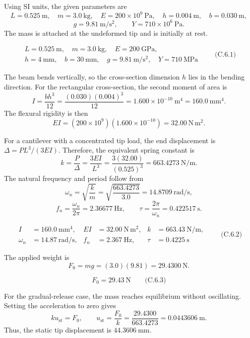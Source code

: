 Using SI units, the given parameters are
\[
L=0.525\ \mathrm{m},\quad m=3.0\ \mathrm{kg},\quad
E=200\times10^{9}\ \mathrm{Pa},\quad
h=0.004\ \mathrm{m},\quad b=0.030\ \mathrm{m},
\]
\[
g=9.81\ \mathrm{m/s^2},\qquad Y=710\times10^{6}\ \mathrm{Pa}.
\]
The mass is attached at the undeformed tip and is initially at rest.

\[
\boxed{\begin{gathered}
L=0.525\ \mathrm{m},\quad m=3.0\ \mathrm{kg},\quad E=200\ \mathrm{GPa},\\
h=4\ \mathrm{mm},\quad b=30\ \mathrm{mm},\quad
g=9.81\ \mathrm{m/s^2},\quad Y=710\ \mathrm{MPa}
\end{gathered}}
\qquad\text{(C.6.1)}
\]

The beam bends vertically, so the cross-section dimension \(h\) lies in the bending direction. For the rectangular cross-section, the second moment of area is
\[
I=\frac{bh^3}{12}
 =\frac{(0.030)(0.004)^3}{12}
 =1.600\times10^{-10}\ \mathrm{m^4}
 =160.0\ \mathrm{mm^4}.
\]
The flexural rigidity is then
\[
EI=(200\times10^9)(1.600\times10^{-10})
 =32.00\ \mathrm{N\,m^2}.
\]

For a cantilever with a concentrated tip load, the end displacement is \(\Delta=PL^3/(3EI)\). Therefore, the equivalent spring constant is
\[
k=\frac{P}{\Delta}=\frac{3EI}{L^3}
 =\frac{3(32.00)}{(0.525)^3}
 =663.4273\ \mathrm{N/m}.
\]
The natural frequency and period follow from
\[
\omega_n=\sqrt{\frac{k}{m}}
 =\sqrt{\frac{663.4273}{3.0}}
 =14.8709\ \mathrm{rad/s},
\]
\[
f_n=\frac{\omega_n}{2\pi}=2.36677\ \mathrm{Hz},
\qquad
\tau=\frac{2\pi}{\omega_n}=0.422517\ \mathrm{s}.
\]

\[
\boxed{\begin{aligned}
I&=160.0\ \mathrm{mm^4},&
EI&=32.00\ \mathrm{N\,m^2},&
k&=663.43\ \mathrm{N/m},\\
\omega_n&=14.87\ \mathrm{rad/s},&
f_n&=2.367\ \mathrm{Hz},&
\tau&=0.4225\ \mathrm{s}
\end{aligned}}
\qquad\text{(C.6.2)}
\]

The applied weight is
\[
F_0=mg=(3.0)(9.81)=29.4300\ \mathrm{N}.
\]

\[
\boxed{F_0=29.43\ \mathrm{N}}\qquad\text{(C.6.3)}
\]

For the gradual-release case, the mass reaches equilibrium without oscillating. Setting the acceleration to zero gives
\[
ku_{\mathrm{st}}=F_0,
\qquad
u_{\mathrm{st}}=\frac{F_0}{k}
 =\frac{29.4300}{663.4273}
 =0.0443606\ \mathrm{m}.
\]
Thus, the static tip displacement is \(44.3606\ \mathrm{mm}\).

